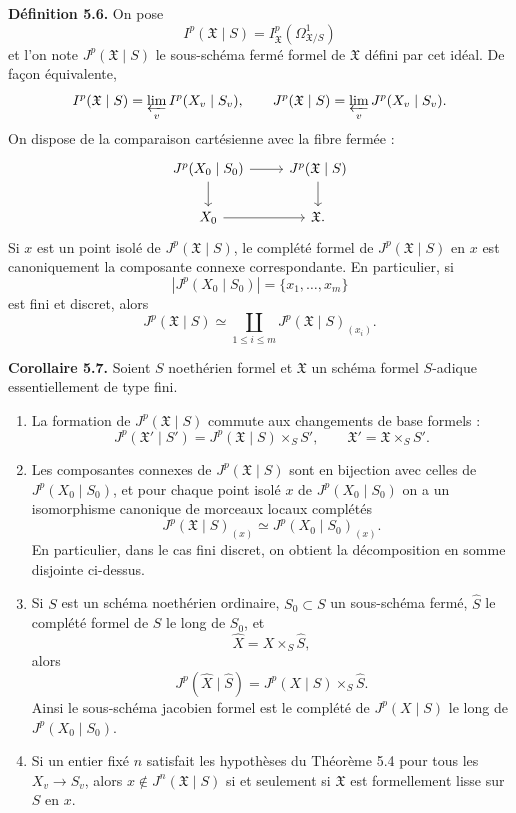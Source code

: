 \documentclass[11pt]{article}
\begin{document}
\textbf{Définition 5.6.}  On pose
\[
        I^p(\mathfrak X\mid S)=I^p_{\mathfrak X}(\Omega^1_{\mathfrak X/S})
\]
et l'on note \(J^p(\mathfrak X\mid S)\) le sous-schéma fermé formel de \(\mathfrak X\) défini par cet idéal.  De façon équivalente,
\[
        I^p(\mathfrak X\mid S)=\varprojlim_v I^p(X_v\mid S_v),
        \qquad
        J^p(\mathfrak X\mid S)=\varprojlim_v J^p(X_v\mid S_v).
\]
On dispose de la comparaison cartésienne avec la fibre fermée :
\[
\begin{tikzcd}
J^p(X_0\mid S_0) \arrow[r] \arrow[d] &
J^p(\mathfrak X\mid S) \arrow[d]\\
X_0 \arrow[r] & \mathfrak X .
\end{tikzcd}
\]
Si \(x\) est un point isolé de \(J^p(\mathfrak X\mid S)\), le complété formel de \(J^p(\mathfrak X\mid S)\) en \(x\) est canoniquement la composante connexe correspondante.  En particulier, si
\[
        |J^p(X_0\mid S_0)|=\{x_1,\ldots,x_m\}
\]
est fini et discret, alors
\[
        J^p(\mathfrak X\mid S)
        \simeq
        \coprod_{1\leq i\leq m} J^p(\mathfrak X\mid S)_{(x_i)}.
\]

\textbf{Corollaire 5.7.}  Soient \(S\) noethérien formel et \(\mathfrak X\) un schéma formel \(S\)-adique essentiellement de type fini.
\begin{enumerate}[label=(\arabic*)]
\item La formation de \(J^p(\mathfrak X\mid S)\) commute aux changements de base formels :
\[
        J^p(\mathfrak X'\mid S')=
        J^p(\mathfrak X\mid S)\times_S S',
        \qquad \mathfrak X'=\mathfrak X\times_S S'.
\]
\item Les composantes connexes de \(J^p(\mathfrak X\mid S)\) sont en bijection avec celles de \(J^p(X_0\mid S_0)\), et pour chaque point isolé \(x\) de \(J^p(X_0\mid S_0)\) on a un isomorphisme canonique de morceaux locaux complétés
\[
        J^p(\mathfrak X\mid S)_{(x)}
        \simeq
        J^p(X_0\mid S_0)_{(x)} .
\]
En particulier, dans le cas fini discret, on obtient la décomposition en somme disjointe ci-dessus.
\item Si \(S\) est un schéma noethérien ordinaire, \(S_0\subset S\) un sous-schéma fermé, \(\widehat S\) le complété formel de \(S\) le long de \(S_0\), et
\[
        \widehat X=X\times_S\widehat S,
\]
alors
\[
        J^p(\widehat X\mid \widehat S)
        =
        J^p(X\mid S)\times_S \widehat S.
\]
Ainsi le sous-schéma jacobien formel est le complété de \(J^p(X\mid S)\) le long de \(J^p(X_0\mid S_0)\).
\item Si un entier fixé \(n\) satisfait les hypothèses du Théorème 5.4 pour tous les \(X_v\to S_v\), alors \(x\notin J^n(\mathfrak X\mid S)\) si et seulement si \(\mathfrak X\) est formellement lisse sur \(S\) en \(x\).
\end{enumerate}
\end{document}
